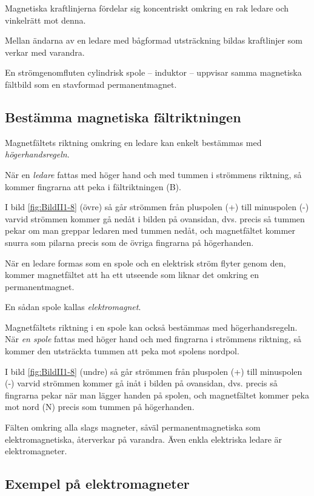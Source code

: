 Magnetiska kraftlinjerna fördelar sig koncentriskt omkring en rak ledare och
vinkelrätt mot denna.

Mellan ändarna av en ledare med bågformad utsträckning bildas kraftlinjer som
verkar med varandra.

En strömgenomfluten cylindrisk spole -- induktor -- uppvisar samma magnetiska
fältbild som en stavformad permanentmagnet.

\subsection{Bestämma magnetiska fältriktningen}

Magnetfältets riktning omkring en ledare kan enkelt bestämmas med
\emph{högerhandsregeln}.

När en \emph{ledare} fattas med höger hand och med tummen i strömmens
riktning, så kommer fingrarna att peka i fältriktningen (B).

I bild \ref{fig:BildII1-8} (övre) så går strömmen från pluspolen (+) till
minuspolen (-) varvid strömmen kommer gå nedåt i bilden på ovansidan,
dvs. precis så tummen pekar om man greppar ledaren med tummen nedåt, och
magnetfältet kommer snurra som pilarna precis som de övriga fingrarna på
högerhanden.

När en ledare formas som en spole och en elektrisk ström flyter genom den,
kommer magnetfältet att ha ett utseende som liknar det omkring en
permanentmagnet.

En sådan spole kallas \emph{elektromagnet}.

Magnetfältets riktning i en spole kan också bestämmas med högerhandsregeln.
När \emph{en spole} fattas med höger hand och med fingrarna i strömmens
riktning, så kommer den utsträckta tummen att peka mot spolens nordpol.

I bild \ref{fig:BildII1-8} (undre) så går strömmen från pluspolen (+) till minuspolen
(-) varvid strömmen kommer gå inåt i bilden på ovansidan, dvs. precis så
fingrarna pekar när man lägger handen på spolen, och magnetfältet kommer peka
mot nord (N) precis som tummen på högerhanden.

Fälten omkring alla slags magneter, såväl permanentmagnetiska som
elektromagnetiska, återverkar på varandra.
Även enkla elektriska ledare är elektromagneter.

\clearpage

\subsection{Exempel på elektromagneter}

